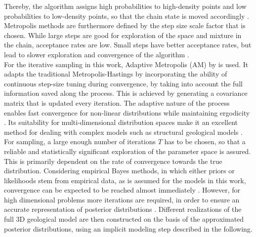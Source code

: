         Thereby, the algorithm assigns high probabilities to high-density points and low probabilities to low-density points, so that the chain state is moved accordingly \citep{delaVarga2016}.\\
        Metropolis methods are furthermore defined by the step size scale factor that is chosen. While large steps are good for exploration of the space and mixture in the chain, acceptance rates are low. Small steps have better acceptance rates, but lead to slower exploration and convergence of the algorithm \citep{delaVarga2016}.\\
        For the iterative sampling in this work, Adaptive Metropolis (AM) by \citet{haario2001adaptive} is used. It adapts the traditional Metropolis-Hastings by incorporating the ability of continuous step-size tuning during convergence, by taking into account the full information saved along the process. This is achieved by generating a covariance matrix that is updated every iteration. The adaptive nature of the process enables fast convergence for non-linear distributions while maintaining ergodicity \citep{haario2001adaptive, delaVarga2016}. Its suitability for multi-dimensional distribution spaces make it an excellent method for dealing with complex models such as structural geological models \citep{schaaf2017}.\\
        For sampling, a large enough number of iterations $T$ has to be chosen, so that a reliable and statistically significant exploration of the parameter space is assured. This is primarily dependent on the rate of convergence towards the true distribution. Considering empirical Bayes methods, in which either priors or likelihoods stem from empirical data, as is assumed for the models in this work, convergence can be expected to be reached almost immediately \citep{delaVarga2016}. However, for high dimensional problems more iterations are required, in order to ensure an accurate representation of posterior distributions \citep{wellmann2017sandstone}. Different realizations of the full 3D geological model are then constructed on the basis of the approximated posterior distributions, using an implicit modeling step described in the following.
        
